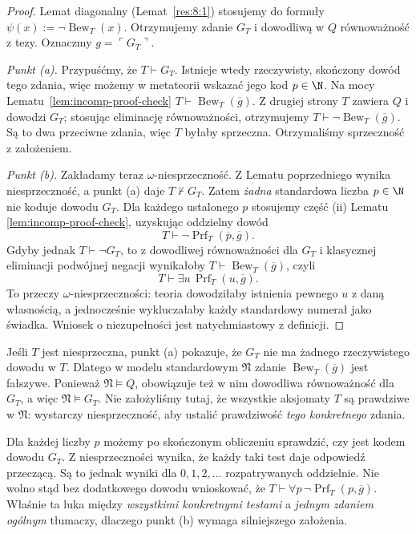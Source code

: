\begin{proof}
Lemat diagonalny (Lemat~\ref{res:8:1}) stosujemy do
formuły $\psi(x):=\neg\operatorname{Bew}_T(x)$.
Otrzymujemy zdanie $G_T$ i dowodliwą w $Q$
równoważność z tezy. Oznaczmy $g=\ulcorner G_T\urcorner$.

\emph{Punkt (a).} Przypuśćmy, że $T\vdash G_T$.
Istnieje wtedy rzeczywisty, skończony dowód tego zdania,
więc możemy w metateorii wskazać jego kod $p\in\N$.
Na mocy Lematu~\ref{lem:incomp-proof-check}
$T\vdash\operatorname{Bew}_T(\overline g)$.
Z drugiej strony $T$ zawiera $Q$ i dowodzi $G_T$;
stosując eliminację równoważności, otrzymujemy
$T\vdash\neg\operatorname{Bew}_T(\overline g)$.
Są to dwa przeciwne zdania, więc $T$ byłaby sprzeczna.
Otrzymaliśmy sprzeczność z założeniem.

\emph{Punkt (b).} Zakładamy teraz $\omega$-niesprzeczność.
Z Lematu poprzedniego wynika niesprzeczność, a punkt (a)
daje $T\nvdash G_T$. Zatem \emph{żadna} standardowa
liczba $p\in\N$ nie koduje dowodu $G_T$.
Dla każdego ustalonego $p$ stosujemy część (ii) Lematu
\ref{lem:incomp-proof-check}, uzyskując oddzielny dowód
\[
T\vdash\neg\operatorname{Prf}_T(\overline p,\overline g).
\]
Gdyby jednak $T\vdash\neg G_T$, to z dowodliwej
równoważności dla $G_T$ i klasycznej eliminacji podwójnej
negacji wynikałoby
$T\vdash\operatorname{Bew}_T(\overline g)$, czyli
\[
T\vdash\exists u\,\operatorname{Prf}_T(u,\overline g).
\]
To przeczy $\omega$-niesprzeczności: teoria dowodziłaby
istnienia pewnego $u$ z daną własnością, a jednocześnie
wykluczałaby każdy standardowy numerał jako świadka.
Wniosek o niezupełności jest natychmiastowy z definicji.
\end{proof}

\begin{uwaga}\label{rem:godel-true}
Jeśli $T$ jest niesprzeczna, punkt (a) pokazuje, że
$G_T$ nie ma żadnego rzeczywistego dowodu w $T$.
Dlatego w modelu standardowym $\mathfrak N$ zdanie
$\operatorname{Bew}_T(\overline g)$ jest fałszywe.
Ponieważ $\mathfrak N\models Q$, obowiązuje też w nim
dowodliwa równoważność dla $G_T$, a więc
$\mathfrak N\models G_T$.
Nie założyliśmy tutaj, że wszystkie aksjomaty $T$ są
prawdziwe w $\mathfrak N$: wystarczy niesprzeczność,
aby ustalić prawdziwość \emph{tego konkretnego} zdania.
\end{uwaga}

\begin{przyklad}
Dla każdej liczby $p$ możemy po skończonym obliczeniu
sprawdzić, czy jest kodem dowodu $G_T$.
Z niesprzeczności wynika, że każdy taki test daje
odpowiedź przeczącą. Są to jednak wyniki dla
$0,1,2,\ldots$ rozpatrywanych oddzielnie.
Nie wolno stąd bez dodatkowego dowodu wnioskować,
że $T\vdash\forall p\,\neg\operatorname{Prf}_T(p,\overline g)$.
Właśnie ta luka między \emph{wszystkimi konkretnymi testami}
a \emph{jednym zdaniem ogólnym} tłumaczy, dlaczego
punkt (b) wymaga silniejszego założenia.
\end{przyklad}

